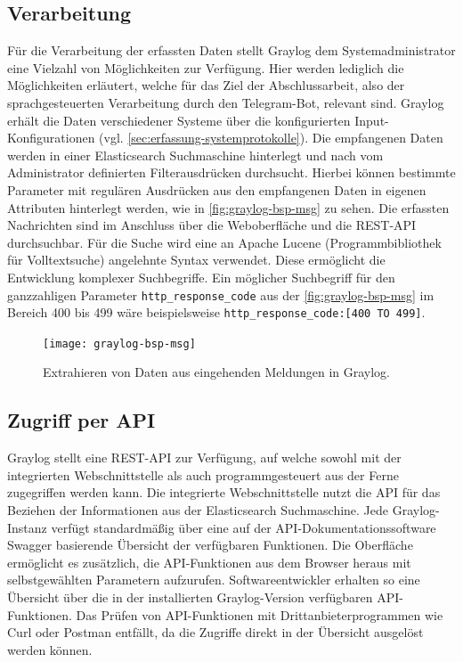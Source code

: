 \subsection{Verarbeitung}

Für die Verarbeitung der erfassten Daten stellt Graylog dem Systemadministrator eine Vielzahl von Möglichkeiten zur Verfügung. Hier werden lediglich die Möglichkeiten erläutert, welche für das Ziel der Abschlussarbeit, also der sprachgesteuerten Verarbeitung durch den Telegram-Bot, relevant sind. Graylog erhält die Daten verschiedener Systeme über die konfigurierten Input-Konfigurationen (vgl. \autoref{sec:erfassung-systemprotokolle}). Die empfangenen Daten werden in einer Elasticsearch Suchmaschine hinterlegt und nach vom Administrator definierten Filterausdrücken durchsucht. Hierbei können bestimmte Parameter mit regulären Ausdrücken aus den empfangenen Daten in eigenen Attributen hinterlegt werden, wie in \autoref{fig:graylog-bsp-msg} zu sehen. Die erfassten Nachrichten sind im Anschluss über die Weboberfläche und die REST-API durchsuchbar. Für die Suche wird eine an Apache Lucene (Programmbibliothek für Volltextsuche) angelehnte Syntax verwendet. Diese ermöglicht die Entwicklung komplexer Suchbegriffe. Ein möglicher Suchbegriff für den ganzzahligen Parameter \lstinline{http_response_code} aus der \autoref{fig:graylog-bsp-msg} im Bereich 400 bis 499 wäre beispielsweise \lstinline{http_response_code:[400 TO 499]}. 

\begin{figure}[h!]
\centering
\texttt{[image: graylog-bsp-msg]}
\caption{Extrahieren von Daten aus eingehenden Meldungen in Graylog.}
\label{fig:graylog-bsp-msg}
\end{figure}

\subsection{Zugriff per API}

Graylog stellt eine REST-API zur Verfügung, auf welche sowohl mit der integrierten Webschnittstelle als auch programmgesteuert aus der Ferne zugegriffen werden kann. Die integrierte Webschnittstelle nutzt die API für das Beziehen der Informationen aus der Elasticsearch Suchmaschine. Jede Graylog-Instanz verfügt standardmäßig über eine auf der API-Dokumentationssoftware Swagger basierende Übersicht der verfügbaren Funktionen. Die Oberfläche ermöglicht es zusätzlich, die API-Funktionen aus dem Browser heraus mit selbstgewählten Parametern aufzurufen. Softwareentwickler erhalten so eine Übersicht über die in der installierten Graylog-Version verfügbaren API-Funktionen. Das Prüfen von API-Funktionen mit Drittanbieterprogrammen wie Curl oder Postman entfällt, da die Zugriffe direkt in der Übersicht ausgelöst werden können. 

